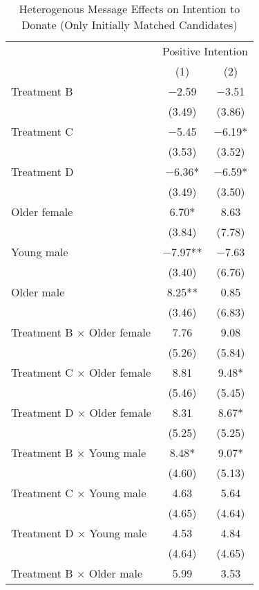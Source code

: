 \documentclass[12pt, a4paper]{article}
\begin{document}
\begin{table}[H]

\caption{\label{tab:lm-positive-interaction-init-reg}Heterogenous Message Effects on Intention to Donate (Only Initially Matched Candidates)}
\centering
\fontsize{8}{10}\selectfont
\begin{threeparttable}
\begin{tabular}[t]{lcc}
\toprule
\multicolumn{1}{c}{ } & \multicolumn{2}{c}{Positive Intention} \\
\cmidrule(l{3pt}r{3pt}){2-3}
  & (1) & (2)\\
\midrule
Treatment B & \num{-2.59} & \num{-3.51}\\
 & (\num{3.49}) & (\num{3.86})\\
Treatment C & \num{-5.45} & \num{-6.19}*\\
 & (\num{3.53}) & (\num{3.52})\\
Treatment D & \num{-6.36}* & \num{-6.59}*\\
 & (\num{3.49}) & (\num{3.50})\\
Older female & \num{6.70}* & \num{8.63}\\
 & (\num{3.84}) & (\num{7.78})\\
Young male & \num{-7.97}** & \num{-7.63}\\
 & (\num{3.40}) & (\num{6.76})\\
Older male & \num{8.25}** & \num{0.85}\\
 & (\num{3.46}) & (\num{6.83})\\
Treatment B $\times$ Older female & \num{7.76} & \num{9.08}\\
 & (\num{5.26}) & (\num{5.84})\\
Treatment C $\times$ Older female & \num{8.81} & \num{9.48}*\\
 & (\num{5.46}) & (\num{5.45})\\
Treatment D $\times$ Older female & \num{8.31} & \num{8.67}*\\
 & (\num{5.25}) & (\num{5.25})\\
Treatment B $\times$ Young male & \num{8.48}* & \num{9.07}*\\
 & (\num{4.60}) & (\num{5.13})\\
Treatment C $\times$ Young male & \num{4.63} & \num{5.64}\\
 & (\num{4.65}) & (\num{4.64})\\
Treatment D $\times$ Young male & \num{4.53} & \num{4.84}\\
 & (\num{4.64}) & (\num{4.65})\\
Treatment B $\times$ Older male & \num{5.99} & \num{3.53}\\

\end{tabular}
\end{threeparttable}
\end{table}
\end{document}
